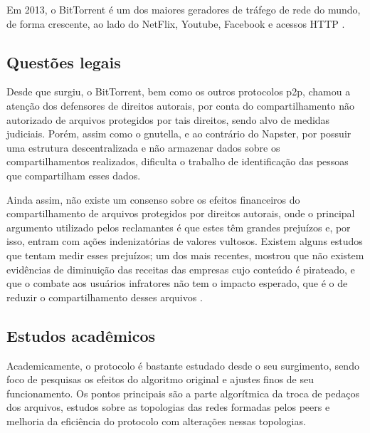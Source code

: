 Em 2013, o BitTorrent é um dos maiores geradores de tráfego de rede do mundo, de forma
crescente, ao lado do NetFlix, Youtube, Facebook e acessos HTTP
\cite{report:internet-usage-2013}.

\subsection*{Questões legais}

Desde que surgiu, o BitTorrent, bem como os outros protocolos \gls*{p2p}, chamou a
atenção dos defensores de direitos autorais, por conta do compartilhamento não
autorizado de arquivos protegidos por tais direitos, sendo alvo de medidas judiciais.
Porém, assim como o \gls*{gnutella}, e ao contrário do Napster, por possuir uma
estrutura descentralizada e não armazenar dados sobre os compartilhamentos realizados,
dificulta o trabalho de identificação das pessoas que compartilham esses dados.

Ainda assim, não existe um consenso sobre os efeitos financeiros do compartilhamento de
arquivos protegidos por direitos autorais, onde o principal argumento utilizado pelos
reclamantes é que estes têm grandes prejuízos e, por isso, entram com ações
indenizatórias de valores vultosos. Existem alguns estudos que tentam medir esses
prejuízos; um dos mais recentes, mostrou que não existem evidências de diminuição das
receitas das empresas cujo conteúdo é pirateado, e que o combate aos usuários
infratores não tem o impacto esperado, que é o de reduzir o compartilhamento desses
arquivos \cite{report:lse-piracy}.

\subsection*{Estudos acadêmicos}

Academicamente, o protocolo é bastante estudado desde o seu surgimento, sendo foco de
pesquisas os efeitos do algoritmo original e ajustes finos de seu funcionamento. Os
pontos principais são a parte algorítmica da troca de pedaços dos arquivos, estudos
sobre as topologias das redes formadas pelos \glspl*{peer} e melhoria da eficiência
do protocolo com alterações nessas topologias.

\afterpage{\clearpage}
